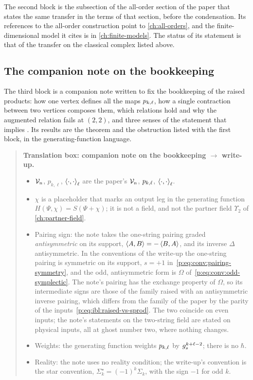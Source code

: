 

\medskip
The second block is the subsection of the all-order section of the paper that states the same transfer in the terms of that section, before the condensation.
Its references to the all-order construction point to \cref{ch:all-orders}, and the finite-dimensional model it cites is in \cref{ch:finite-models}.
The status of its statement is that of the transfer on the classical complex listed above.



\subsection*{The companion note on the bookkeeping}

The third block is a companion note written to fix the bookkeeping of the raised products: how one vertex defines all the maps $\sprod{k}{\ell}$, how a single contraction between two vertices composes them, which \IBL{} relations hold and why the augmented relation fails at $(2, 2)$, and three senses of the statement that \Loo{} implies \IBL{}.
Its results are the theorem and the obstruction listed with the first block, in the generating-function language.

\begin{quote}
  \small
  \textbf{Translation box: companion note on the bookkeeping $\to$ write-up.}
  \begin{itemize}
    \setlength{\itemsep}{0.3ex}
    \item $\mc V_n$, $p_{k, \ell}$, $\braket{\cdot, \cdot}_\ell$ are the paper's $\vertex{n}$, $\sprod{k}{\ell}$, $\pair[\ell]{\cdot}{\cdot}$.
    \item $\chi$ is a placeholder that marks an output leg in the generating function $H(\Psi, \chi) = S(\Psi + \chi)$; it is not a field, and not the partner field $\Upsilon_2$ of \cref{ch:partner-field}.
    \item Pairing sign: the note takes the one-string pairing graded \emph{antisymmetric} on its support, $\braket{A, B} = - \braket{B, A}$, and its inverse $\Delta$ antisymmetric.
      In the conventions of the write-up the one-string pairing is symmetric on its support, $s = + 1$ in~\eqref{p:eq:conv:pairing-symmetry}, and the odd, antisymmetric form is $\Omega$ of~\eqref{p:eq:conv:odd-symplectic}.
      The note's pairing has the exchange property of $\Omega$, so its intermediate signs are those of the family raised with an antisymmetric inverse pairing, which differs from the family of the paper by the parity of the inputs~\eqref{p:eq:ibl:raised-vs-sprod}.
      The two coincide on even inputs; the note's statements on the two-string field are stated on physical inputs, all at ghost number two, where nothing changes.
    \item Weights: the generating function weights $\sprod{k}{\ell}$ by $\gs^{k + \ell - 2}$; there is no $\hbar$.
    \item Reality: the note uses no reality condition; the write-up's convention is the star convention, $\Sigma_k^\star = (-1)^k \Sigma_k$, with the sign $-1$ for odd $k$.
  \end{itemize}
\end{quote}


